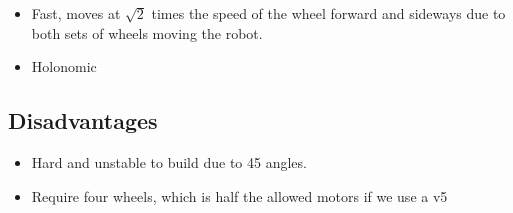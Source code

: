 \documentclass[../../main.tex]{subfiles}
\begin{document}
\begin{itemize}
	\item Fast, moves at $\sqrt{2}$ times the speed of the wheel forward and sideways due to
	      both sets of wheels moving the robot.
	\item Holonomic

\end{itemize}


\subsection{Disadvantages}

\begin{itemize}
	\item Hard and unstable to build due to 45 \degree angles.
	\item Require four wheels, which is half the allowed motors
	      if we use a v5
\end{itemize}
\end{document}
